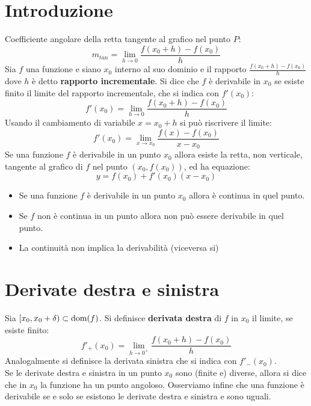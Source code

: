 \documentclass[12pt, a4paper]{report}
\begin{document}
    \section{Introduzione}
    Coefficiente angolare della retta tangente al grafico nel punto $P$:
    \begin{equation*}
        m_{tan}=\lim_{h\to 0}\frac{f(x_{0}+h)-f(x_{0})}{h}
    \end{equation*}
    Sia $f$ una funzione e siano $x_{0}$ interno al suo dominio e il rapporto $\frac{f(x_{0}+h)-f(x_{0})}{h}$ dove $h$ è detto \textbf{rapporto incrementale}. Si dice che $f$ è derivabile in $x_{0}$ se esiste finito il limite del rapporto incrementale, che si indica con $f'(x_{0})$:
    \begin{equation*}
        f'(x_{0})=\lim_{h\to 0}\frac{f(x_{0}+h)-f(x_{0})}{h}
    \end{equation*}
    Usando il cambiamento di variabile $x=x_{0}+h$ si può riscrivere il limite:
    \begin{equation*}
        f'(x_{0})=\lim_{x\to x_{0}}\frac{f(x)-f(x_{0})}{x-x_{0}}
    \end{equation*}
    Se una funzione $f$ è derivabile in un punto $x_{0}$ allora esiste la retta, non verticale, tangente al grafico di $f$ nel punto $(x_{0},f(x_{0}))$, ed ha equazione:
    \begin{equation*}
        y = f(x_{0})+f'(x_{0})(x-x_{0})
    \end{equation*}
    \begin{itemize}
        \item Se una funzione $f$ è derivabile in un punto $x_{0}$ allora è continua in quel punto.
        \item Se $f$ non è continua in un punto allora non può essere derivabile in quel punto.
        \item La continuità non implica la derivabilità (viceversa si)
    \end{itemize}
    \section{Derivate destra e sinistra}
    Sia $[x_{0},x_{0}+\delta)\subset \text{dom}(f)$. Si definisce \textbf{derivata destra} di $f$ in $x_{0}$ il limite, se esiste finito:
    \begin{equation*}
        f'_{+}(x_{0})=\lim_{h\to 0^{+}}\frac{f(x_{0}+h)-f(x_{0})}{h}
    \end{equation*}
    Analogalmente si definisce la derivata sinistra che si indica con $f'_{-}(x_{0})$.\\
    Se le derivate destra e sinistra in un punto $x_{0}$ sono (finite e) diverse, allora si dice che in $x_{0}$ la funzione ha un punto angoloso. Osserviamo infine che una funzione è derivabile se e solo se esistono le derivate destra e sinistra e sono uguali.
\end{document}
